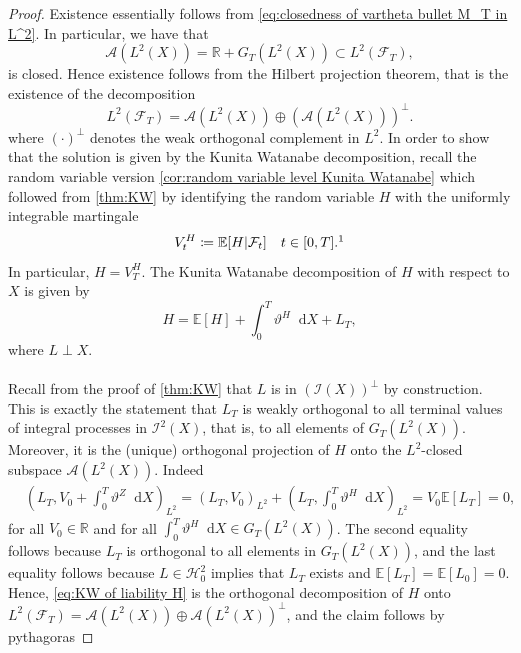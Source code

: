 \documentclass[11pt,a4paper,twoside,openany]{report}
\newcommand{\diff}{\mathop{}\!\mathrm{d}}
\theoremstyle{plain} %
\theoremstyle{definition} %
\theoremstyle{remark} %
\begin{document}
\begin{proof}
    Existence essentially follows from \cref{eq:closedness of vartheta bullet M_T in L^2}. In particular, we have that  
    \begin{equation}
        \mathcal{A}(L^2(X))=\mathbb{R}+G_T(L^2(X))\subset L^2(\mathcal{F}_T),
    \end{equation}
    is closed. Hence existence follows from the Hilbert projection theorem, that is the existence of the decomposition
    \begin{equation}
        L^2(\mathcal{F}_T)=\mathcal{A}(L^2(X))\oplus(\mathcal{A}(L^2(X)))^{\perp}.
    \end{equation}
    where \((\cdot)^{\perp}\) denotes the weak orthogonal complement in \(L^2\).
    \bigbreak
    In order to show that the solution is given by the Kunita Watanabe decomposition, recall the random variable version \cref{cor:random variable level Kunita Watanabe} which followed from \cref{thm:KW} by identifying the random variable \(H\) with the uniformly integrable martingale  
    \begin{equation}\label{eq:identifying r.v. H with process V}
        V^H_t\coloneqq \mathbb{E}[H|\mathcal{F}_t]\quad t\in[0,T].\footnotemark
    \end{equation}
 In particular, \(H=V^H_{T}\). The Kunita Watanabe decomposition of \(H\) with respect to \(X\) is given by 
 \begin{equation}\label{eq:KW of liability H}
    H=\mathbb{E}[H]+\int_0^{T}\vartheta^H\diff X+L_T ,
 \end{equation}
 where \(L\perp X\). 
 \\\\
 Recall from the proof of \cref{thm:KW} that \(L\) is in \((\mathcal{I}(X))^{\perp}\) by construction. This is exactly the statement that \(L_T\) is weakly orthogonal to all terminal values of integral processes in \(\mathcal{I}^2(X)\), that is, to all elements of \(G_T(L^2(X))\). Moreover, it is the (unique) orthogonal projection of \(H\) onto the \(L^2\)-closed subspace \(\mathcal{A}(L^2(X))\). Indeed
\begin{align*}
    &(L_T,V_0+\int_0^T \vartheta^Z\diff X)_{L^2}= (L_T,V_0)_{L^2}+ (L_T,\int_0^T \vartheta^H\diff X)_{L^2}=V_0\mathbb{E}[L_T]=0,
\end{align*}
for all \(V_0\in\mathbb{R}\) and for all \(\int_0^T\vartheta^H\diff X\in G_T(L^2(X))\). The second equality follows because \(L_T\) is orthogonal to all elements in \(G_T(L^2(X))\), and the last equality follows because \(L\in\mathcal{H}_0^2\) implies that \(L_{T}\) exists and \(\mathbb{E}[L_{T}]=\mathbb{E}[L_0]=0\). Hence, \cref{eq:KW of liability H} is the orthogonal decomposition of \(H\) onto \(L^2(\mathcal{F}_T)=\mathcal{A}(L^2(X))\oplus \mathcal{A}(L^2(X))^{\perp}\), and the claim follows by pythagoras

\end{proof}
\end{document}
